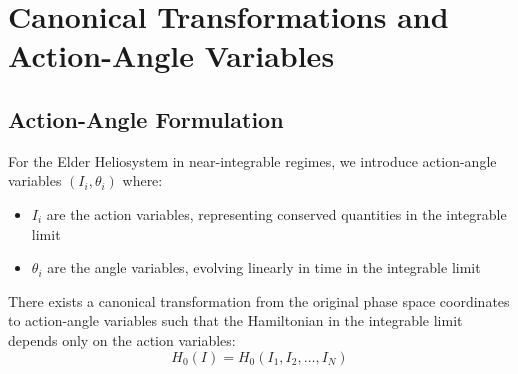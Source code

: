 \section{Canonical Transformations and Action-Angle Variables}

\subsection{Action-Angle Formulation}

\begin{definition}
For the Elder Heliosystem in near-integrable regimes, we introduce action-angle variables $(I_i, \theta_i)$ where:
\begin{itemize}
    \item $I_i$ are the action variables, representing conserved quantities in the integrable limit
    \item $\theta_i$ are the angle variables, evolving linearly in time in the integrable limit
\end{itemize}
\end{definition}

\begin{theorem}
There exists a canonical transformation from the original phase space coordinates to action-angle variables such that the Hamiltonian in the integrable limit depends only on the action variables:
\begin{equation}
H_0(I) = H_0(I_1, I_2, \ldots, I_N)
\end{equation}
\end{theorem}

